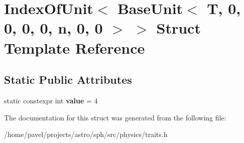 \hypertarget{structIndexOfUnit_3_01BaseUnit_3_01T_00_010_00_010_00_010_00_010_00_01n_00_010_00_010_01_4_01_4}{}\section{Index\+Of\+Unit$<$ Base\+Unit$<$ T, 0, 0, 0, 0, n, 0, 0 $>$ $>$ Struct Template Reference}
\label{structIndexOfUnit_3_01BaseUnit_3_01T_00_010_00_010_00_010_00_010_00_01n_00_010_00_010_01_4_01_4}
\subsection*{Static Public Attributes}
\begin{DoxyCompactItemize}
\item 
\hypertarget{structIndexOfUnit_3_01BaseUnit_3_01T_00_010_00_010_00_010_00_010_00_01n_00_010_00_010_01_4_01_4_a89992307d737f33ea8bddd35685555e1}{}\label{structIndexOfUnit_3_01BaseUnit_3_01T_00_010_00_010_00_010_00_010_00_01n_00_010_00_010_01_4_01_4_a89992307d737f33ea8bddd35685555e1} 
static constexpr int {\bfseries value} = 4
\end{DoxyCompactItemize}


The documentation for this struct was generated from the following file\+:\begin{DoxyCompactItemize}
\item 
/home/pavel/projects/astro/sph/src/physics/traits.\+h\end{DoxyCompactItemize}
